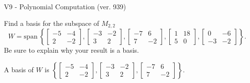\begin{exercise}
  \begin{exerciseTitle}V9 - Polynomial Computation (ver. 939)\end{exerciseTitle}
  \begin{exerciseStatement}
    Find a basis for the subspace of \(M_{2,2}\) 
\[W=\mathrm{span}\ \left\{\left[\begin{array}{cc}
-5 & -4 \\
2 & -2
\end{array}\right] , \left[\begin{array}{cc}
-3 & -2 \\
3 & 2
\end{array}\right] , \left[\begin{array}{cc}
-7 & 6 \\
7 & -2
\end{array}\right] , \left[\begin{array}{cc}
1 & 18 \\
5 & 0
\end{array}\right] , \left[\begin{array}{cc}
0 & -6 \\
-3 & -2
\end{array}\right]\right\}.\]
 Be sure to explain why your result is a basis.


  \end{exerciseStatement}
  \begin{exerciseAnswer}
   A basis of \(W\) is  \(\left\{\left[\begin{array}{cc}
-5 & -4 \\
2 & -2
\end{array}\right] , \left[\begin{array}{cc}
-3 & -2 \\
3 & 2
\end{array}\right] , \left[\begin{array}{cc}
-7 & 6 \\
7 & -2
\end{array}\right]\right\}\).
  


  \end{exerciseAnswer}
\end{exercise}